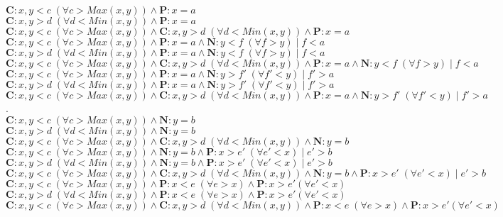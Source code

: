 \documentclass[a4paper]{article}
\begin{document}
\begin{landscape}
\noindent$\mathbf{C}:x,y<c\; (\forall c > Max(x,y))\wedge \mathbf{P}:x=a$\\
$\mathbf{C}:x,y>d\; (\forall d < Min(x,y))\wedge \mathbf{P}:x=a$\\
$\mathbf{C}:x,y<c\; (\forall c > Max(x,y))\wedge \mathbf{C}:x,y>d\; (\forall d < Min(x,y))\wedge \mathbf{P}:x=a$\\

\noindent$\mathbf{C}:x,y<c\; (\forall c > Max(x,y))\wedge \mathbf{P}:x=a\wedge \mathbf{N}:y<f\;(\forall f>y)\;|\; f<a$\\
$\mathbf{C}:x,y>d\; (\forall d<Min(x,y))\wedge \mathbf{P}:x=a\wedge \mathbf{N}:y<f\;(\forall f>y)\;|\; f<a$\\
$\mathbf{C}:x,y<c\; (\forall c>Max(x,y))\wedge \mathbf{C}:x,y>d\; (\forall d<Min(x,y)) \wedge \mathbf{P}:x=a\wedge \mathbf{N}:y<f\;(\forall f>y)\;|\; f<a$\\


\noindent$\mathbf{C}:x,y<c\; (\forall c>Max(x,y))\wedge \mathbf{P}:x=a\wedge \mathbf{N}:y>f'\;(\forall f'<y)\;|\; f'>a$\\
$\mathbf{C}:x,y>d\; (\forall d<Min(x,y))\wedge \mathbf{P}:x=a\wedge \mathbf{N}:y>f'\;(\forall f'<y)\;|\; f'>a$\\
$\mathbf{C}:x,y<c\; (\forall c>Max(x,y))\wedge \mathbf{C}:x,y>d\; (\forall d<Min(x,y))\wedge \mathbf{P}:x=a\wedge \mathbf{N}:y>f'\;(\forall f'<y)\;|\; f'>a$\\
.\\
$\mathbf{C}:x,y<c\; (\forall c > Max(x,y))\wedge \mathbf{N}:y=b$\\
$\mathbf{C}:x,y>d\; (\forall d < Min(x,y))\wedge \mathbf{N}:y=b$\\
$\mathbf{C}:x,y<c\; (\forall c > Max(x,y))\wedge \mathbf{C}:x,y>d\; (\forall d < Min(x,y))\wedge \mathbf{N}:y=b$\\

\noindent$\mathbf{C}:x,y<c\; (\forall c>Max(x,y))\wedge \mathbf{N}:y=b \wedge \mathbf{P}:x>e'\;(\forall e'<x)\;| \; e'>b$\\
$\mathbf{C}:x,y>d\; (\forall d<Min(x,y))\wedge \mathbf{N}:y=b \wedge \mathbf{P}:x>e'\;(\forall e'<x)\;| \; e'>b$\\
$\mathbf{C}:x,y<c\; (\forall c>Max(x,y))\wedge \mathbf{C}:x,y>d\; (\forall d<Min(x,y))\wedge \mathbf{N}:y=b \wedge \mathbf{P}:x>e'\;(\forall e'<x)\;| \; e'>b$\\

\noindent$\mathbf{C}:x,y<c\; (\forall c>Max(x,y))\wedge \mathbf{P}:x<e\;(\forall e>x)\wedge \mathbf{P}:x>e'(\forall e'<x)$\\
$\mathbf{C}:x,y>d\; (\forall d<Min(x,y))\wedge \mathbf{P}:x<e\;(\forall e>x)\wedge \mathbf{P}:x>e'(\forall e'<x)$\\
$\mathbf{C}:x,y<c\; (\forall c>Max(x,y))\wedge \mathbf{C}:x,y>d\; (\forall d<Min(x,y))\wedge \mathbf{P}:x<e\;(\forall e>x)\wedge \mathbf{P}:x>e'(\forall e'<x)$\\



\end{landscape}
\end{document}
